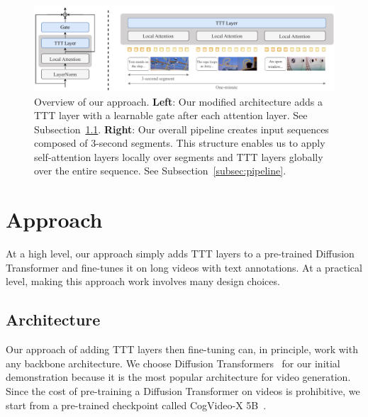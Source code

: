 \begin{figure}[t!]
    \centering
    \includegraphics[width=\textwidth]{figs/integration.pdf}
    \caption{Overview of our approach. 
    \textbf{Left}: Our modified architecture adds a TTT layer with a learnable gate after each attention layer. See Subsection~\ref{subsec:arch}.
    \textbf{Right}: Our overall pipeline creates input sequences composed of 3-second segments. 
    This structure enables us to apply self-attention layers locally over segments and TTT layers globally over the entire sequence.
    See Subsection~\ref{subsec:pipeline}.}
    \label{fig:integration}
\end{figure}

\section{Approach}
\label{sec:method}

At a high level, our approach simply adds TTT layers to a pre-trained Diffusion Transformer and fine-tunes it on long videos with text annotations. At a practical level, making this approach work involves many design choices.

\subsection{Architecture}
\label{subsec:arch}

Our approach of adding TTT layers then fine-tuning can, in principle, work with any backbone architecture.
We choose Diffusion Transformers~\cite{peebles2023scalable} for our initial demonstration because it is the most popular architecture for video generation. 
Since the cost of pre-training a Diffusion Transformer on videos is prohibitive, we start from a pre-trained checkpoint called CogVideo-X 5B~\cite{hong2023cogvideo}.

